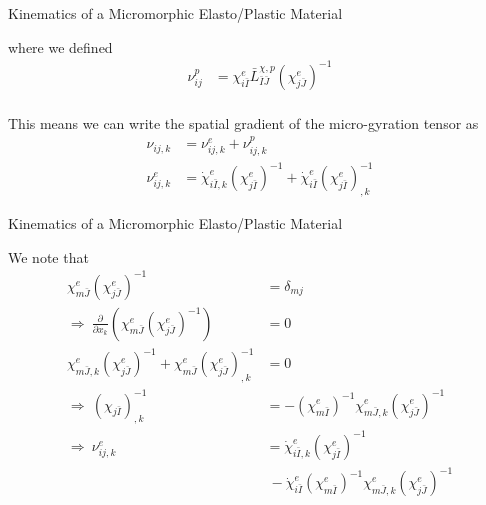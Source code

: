 \documentclass[11pt]{beamer}
\begin{document}
\begin{frame}{Kinematics of a Micromorphic Elasto/Plastic Material}

where we defined
\begin{align*}
\nu_{ij}^p &= \chi_{i\bar{I}}^e \bar{L}_{\bar{I}\bar{J}}^{\chi,p} \left(\chi_{j\bar{J}}^e\right)^{-1}\\
\end{align*}

This means we can write the spatial gradient of the micro-gyration tensor as
\begin{align*}
\nu_{ij,k} &= \nu_{ij,k}^e + \nu_{ij,k}^p\\
\nu_{ij,k}^e &= \dot{\chi}_{i\bar{I},k}^e \left(\chi_{j\bar{I}}^e\right)^{-1} + \dot{\chi}_{i\bar{I}}^e\left(\chi_{j \bar{I}}^e\right)_{,k}^{-1}
\end{align*}

\end{frame}

\begin{frame}{Kinematics of a Micromorphic Elasto/Plastic Material}

We note that
\begin{align*}
\chi_{m\bar{J}}^e \left(\chi_{j \bar{J}}^e\right)^{-1} &= \delta_{mj}\\
\Rightarrow\ \frac{\partial}{\partial x_k} \left(\chi_{m\bar{J}}^e \left(\chi_{j \bar{J}}^e\right)^{-1}\right) &= 0\\
\chi_{m\bar{J},k}^e \left(\chi_{j \bar{J}}^e\right)^{-1} + \chi_{m\bar{J}}^e \left(\chi_{j \bar{J}}^e\right)^{-1}_{,k} &= 0\\
\Rightarrow\ \left(\chi_{j\bar{I}}\right)_{,k}^{-1} &= -\left(\chi_{m\bar{I}}^e\right)^{-1} \chi_{m\bar{J},k}^e\left(\chi_{j\bar{J}}^e\right)^{-1}\\
\Rightarrow\ \nu_{ij,k}^e &= \dot{\chi}_{i\bar{I},k}^e \left(\chi_{j\bar{I}}^e\right)^{-1}\\
&\ - \dot{\chi}_{i\bar{I}}^e \left(\chi_{m\bar{I}}^e\right)^{-1} \chi_{m\bar{J},k}^e\left(\chi_{j\bar{J}}^e\right)^{-1}
\end{align*}

\end{frame}
\end{document}
